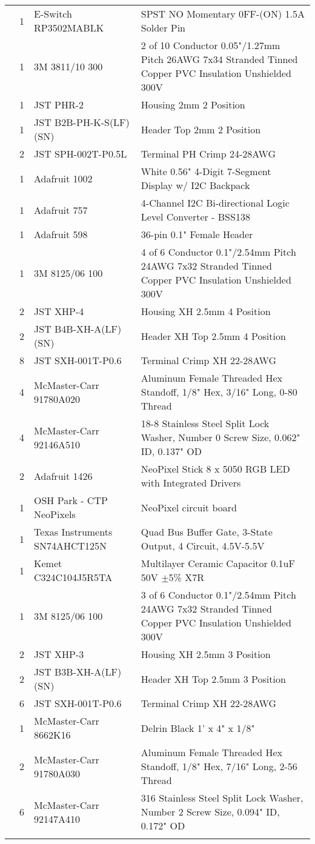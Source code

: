 \begin{longtabu}{X[3,c,m] X[1,c,m] X[3,c,m] X[5,l,m]}
   & 1 & E-Switch RP3502MABLK & SPST NO Momentary 0FF-(ON) 1.5A Solder Pin \\
  & 1 & 3M 3811/10 300 & 2 of 10 Conductor 0.05"/1.27mm Pitch 26AWG 7x34 Stranded Tinned Copper PVC Insulation Unshielded 300V \\
  & 1 & JST PHR-2 & Housing 2mm 2 Position \\
  & 1 & JST B2B-PH-K-S(LF)(SN) & Header Top 2mm 2 Position \\
  & 2 & JST SPH-002T-P0.5L & Terminal PH Crimp 24-28AWG \\ \mrule

   & 1 & Adafruit 1002 & White 0.56" 4-Digit 7-Segment Display w/ I2C Backpack \\
  & 1 & Adafruit 757 & 4-Channel I2C Bi-directional Logic Level Converter - BSS138 \\
  & 1 & Adafruit 598 & 36-pin 0.1" Female Header \\
  & 1 & 3M 8125/06 100 & 4 of 6 Conductor 0.1"/2.54mm Pitch 24AWG 7x32 Stranded Tinned Copper PVC Insulation Unshielded 300V \\
  & 2 & JST XHP-4 & Housing XH 2.5mm 4 Position \\
  & 2 & JST B4B-XH-A(LF)(SN) & Header XH Top 2.5mm 4 Position \\
  & 8 & JST SXH-001T-P0.6 & Terminal Crimp XH 22-28AWG \\
  & 4 & McMaster-Carr 91780A020 & Aluminum Female Threaded Hex Standoff, 1/8" Hex, 3/16" Long, 0-80 Thread \\
  & 4 & McMaster-Carr 92146A510 & 18-8 Stainless Steel Split Lock Washer, Number 0 Screw Size, 0.062" ID, 0.137" OD \\ \mrule

   & 2 & Adafruit 1426 & NeoPixel Stick 8 x 5050 RGB LED with Integrated Drivers \\
  & 1 & OSH Park - CTP NeoPixels & NeoPixel circuit board \\
  & 1 & Texas Instruments SN74AHCT125N & Quad Bus Buffer Gate, 3-State Output, 4 Circuit, 4.5V-5.5V \\
  & 1 & Kemet C324C104J5R5TA & Multilayer Ceramic Capacitor 0.1uF 50V $\pm$5\% X7R \\
  & 1 & 3M 8125/06 100 & 3 of 6 Conductor 0.1"/2.54mm Pitch 24AWG 7x32 Stranded Tinned Copper PVC Insulation Unshielded 300V \\
  & 2 & JST XHP-3 & Housing XH 2.5mm 3 Position \\
  & 2 & JST B3B-XH-A(LF)(SN) & Header XH Top 2.5mm 3 Position \\
  & 6 & JST SXH-001T-P0.6 & Terminal Crimp XH 22-28AWG \\
  & 1 & McMaster-Carr 8662K16 & Delrin Black 1' x 4" x 1/8" \\
  & 2 & McMaster-Carr 91780A030 & Aluminum Female Threaded Hex Standoff, 1/8" Hex, 7/16" Long, 2-56 Thread \\
  & 6 & McMaster-Carr 92147A410 & 316 Stainless Steel Split Lock Washer, Number 2 Screw Size, 0.094" ID, 0.172" OD \\ \mrule


\end{longtabu}
